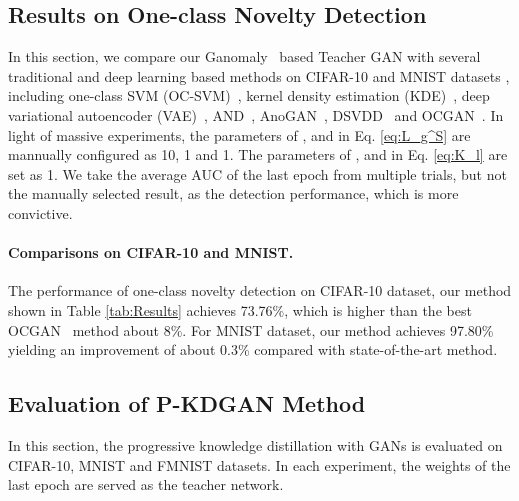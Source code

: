 \documentclass{article}
\begin{document}
	
\subsection{Results on One-class Novelty Detection}
	In this section, we compare our Ganomaly~\cite{ganomaly:2018} based Teacher GAN with several traditional and deep learning based methods on CIFAR-10 and MNIST datasets , including one-class SVM (OC-SVM)~\cite{OCSVM:2001}, kernel density estimation (KDE)~\cite{KDE:1962}, deep variational autoencoder (VAE)~\cite{VAE:2013}, AND~\cite{AND:2019}, AnoGAN~\cite{AnoGAN:2017}, DSVDD~\cite{DSVDD:2018} and OCGAN~\cite{OCGAN:2019}. In light of massive experiments, the parameters of ,  and  in Eq. \ref{eq:L_g^S} are mannually configured as 10, 1 and 1. The parameters of ,  and  in Eq. \ref{eq:K_l} are set as 1. We take the average AUC of the last epoch from multiple trials, but not the manually selected result, as the detection performance, which is more convictive.
	
	\paragraph{Comparisons on CIFAR-10 and MNIST.} The performance of one-class novelty detection on CIFAR-10 dataset, our method shown in Table \ref{tab:Results} achieves 73.76\%, which is higher than the best OCGAN~\cite{OCGAN:2019} method about 8\%. For MNIST dataset, our method achieves 97.80\% yielding an improvement of about 0.3\% compared with state-of-the-art method.
	
	
	\subsection{Evaluation of P-KDGAN Method}
	\label{sec:4.4}
	In this section, the progressive knowledge distillation with GANs is evaluated on CIFAR-10, MNIST and FMNIST datasets. In each experiment, the weights of the last epoch are served as the teacher network.
	
\end{document}
